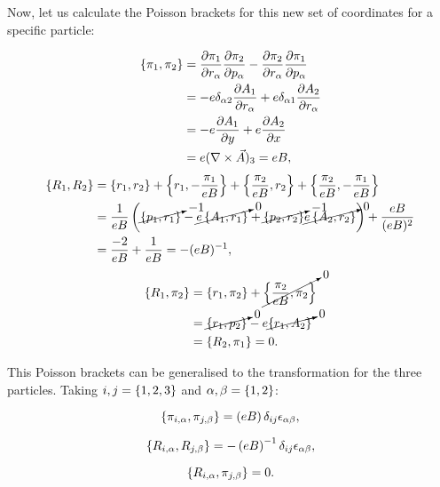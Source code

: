 Now, let us calculate the Poisson brackets for this new set of coordinates for a specific particle:

\begin{align*}
\left\lbrace \pi_1, \pi_2 \right\rbrace &= \frac{\partial \pi_1}{\partial r_{\alpha}}\frac{\partial \pi_2}{\partial p_{\alpha}} - \frac{\partial \pi_2}{\partial r_{\alpha}}\frac{\partial \pi_1}{\partial p_{\alpha}}\\
&= -e\delta_{\alpha 2}\frac{\partial A_1}{\partial r_{\alpha}} +e\delta_{\alpha 1}\frac{\partial A_2}{\partial r_{\alpha}}\\
&= -e\frac{\partial A_1}{\partial y}  + e\frac{\partial A_2}{\partial x}\\
&= e(\nabla \times \vec{A})_3 = eB,
\end{align*}
\begin{align*}
\left\lbrace R_1, R_2 \right\rbrace &= \left\lbrace r_1, r_2 \right\rbrace + \left\lbrace r_1, -\frac{\pi_1}{eB} \right\rbrace +\left\lbrace \frac{\pi_2}{eB}, r_2 \right\rbrace + \left\lbrace \frac{\pi_2}{eB}, -\frac{\pi_1}{eB} \right\rbrace\\
&= \frac{1}{eB}\left( \cancelto{-1}{\left\lbrace p_1, r_1 \right\rbrace}- \cancelto{0}{e\left\lbrace A_1, r_1 \right\rbrace}+\cancelto{-1}{\left\lbrace p_2, r_2 \right\rbrace} \cancelto{0}{e\left\lbrace A_2, r_2 \right\rbrace} \right) +\frac{eB}{(eB)^2}\\
&= \frac{-2}{eB}+ \frac{1}{eB} = -(eB)^{-1},
\end{align*}
\begin{align*}
\left\lbrace R_{1}, \pi_{2} \right\rbrace &= \left\lbrace r_1, \pi_2 \right\rbrace+\cancelto{0}{\left\lbrace \frac{\pi_2}{eB}, \pi_2 \right\rbrace}\\
&= \cancelto{0}{\left\lbrace r_1, p_2 \right\rbrace}-e\cancelto{0}{\left\lbrace r_1, A_2 \right\rbrace}\\
&= \left\lbrace R_2, \pi_1 \right\rbrace = 0.
\end{align*}

This Poisson brackets can be generalised to the transformation for the three particles. Taking $i,j = \left\lbrace 1,2, 3 \right\rbrace$ and $\alpha,\beta=\left\lbrace 1, 2 \right\rbrace$:

\begin{equation}
\left\lbrace \pi_{i,\alpha}, \pi_{j,\beta} \right\rbrace=\left( eB \right)\delta_{ij}\epsilon_{\alpha \beta},
\label{eq:pb1}
\end{equation}

\begin{equation}
\left\lbrace R_{i,\alpha}, R_{j,\beta} \right\rbrace= -\left( eB \right)^{-1} \delta_{ij}\epsilon_{\alpha \beta}  ,
\label{eq:pb2}
\end{equation}

\begin{equation}
\left\lbrace R_{i,\alpha}, \pi_{j,\beta} \right\rbrace=0.
\label{eq:pb3} 
\end{equation}

